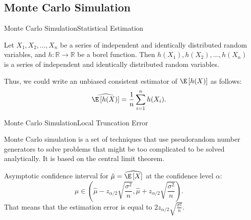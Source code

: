 \subsection{Monte Carlo Simulation}
    \begin{frame}{Monte Carlo Simulation}{Statistical Estimation}
        \begin{lemma}
            Let $X_1, X_2, \dots, X_n$ be a series of independent and identically distributed random variables, and $h: \mathbb{R} \to \mathbb{R}$ be a borel function. Then $h(X_1), h(X_2), \dots, h(X_n)$ is a series of independent and identically distributed random variables.
        \end{lemma}
        Thus, we could write an unbiased consistent estimator of $\E \left[h(X)\right]$ as follows:
        \begin{equation}
            \widehat{\E \left[h(X)\right]} = \frac{1}{n} \sum_{i=1}^n h(X_i).
        \end{equation}
    \end{frame}

    \begin{frame}{Monte Carlo Simulation}{Local Truncation Error}
        \begin{definition}
            Monte Carlo simulation is a set of techniques that use pseudorandom number generators to solve problems that might be too complicated to be solved analytically. It is based on the central limit theorem.
        \end{definition}
        Asymptotic confidence interval for $\hat{\mu} = \widehat{\E\left[X\right]}$ at the confidence level $\alpha$:
        \begin{equation}
            \mu \in \left(\hat{\mu} - z_{\alpha/2} \sqrt{\frac{\sigma^2}{n}}, \hat{\mu} + z_{\alpha/2} \sqrt{\frac{\sigma^2}{n}}\right).
        \end{equation}
        That means that the estimation error is equal to $2z_{\alpha/2} \sqrt{\frac{\sigma^2}{n}}$.
    \end{frame}
    

